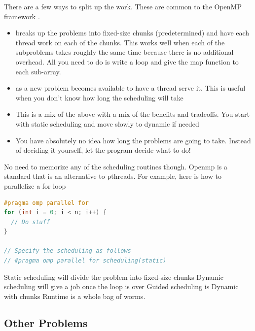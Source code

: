 There are a few ways to split up the work.
These are common to the OpenMP framework \cite{silberschatz2005operating}.

\begin{itemize}
\item {} breaks up the problems into fixed-size chunks (predetermined) and have each thread work on each of the chunks.
  This works well when each of the subproblems takes roughly the same time because there is no additional overhead.
  All you need to do is write a loop and give the map function to each sub-array.
\item {} as a new problem becomes available to have a thread serve it.
  This is useful when you don't know how long the scheduling will take
\item {} This is a mix of the above with a mix of the benefits and tradeoffs.
  You start with static scheduling and move slowly to dynamic if needed
\item {} You have absolutely no idea how long the problems are going to take.
  Instead of deciding it yourself, let the program decide what to do!
\end{itemize}

No need to memorize any of the scheduling routines though.
Openmp is a standard that is an alternative to pthreads.
For example, here is how to parallelize a for loop

\begin{lstlisting}[language=C]
#pragma omp parallel for
for (int i = 0; i < n; i++) {
  // Do stuff
}

// Specify the scheduling as follows
// #pragma omp parallel for scheduling(static)
\end{lstlisting}

Static scheduling will divide the problem into fixed-size chunks
Dynamic scheduling will give a job once the loop is over
Guided scheduling is Dynamic with chunks
Runtime is a whole bag of worms.

\subsection{Other Problems}

